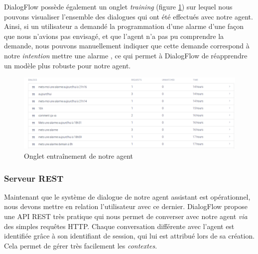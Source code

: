 DialogFlow possède également un onglet \og \emph{training} \fg{} (figure \ref{training}) sur lequel nous pouvons visualiser l'ensemble des dialogues qui ont été effectués avec notre agent. Ainsi,
si un utilisateur a demandé la programmation d'une alarme d'une façon que nous n'avions pas envisagé, et que l'agent n'a pas pu comprendre la demande, nous pouvons 
manuellement indiquer que cette demande correspond à notre \emph{intention} \og mettre une alarme \fg, ce qui permet à DialogFlow de réapprendre un modèle plus robuste pour notre agent.

\begin{figure}[H]
    \centering
        \centering
        \includegraphics[width=1.2\textwidth]{images/training.png}
        \caption{Onglet entraînement de notre agent}
        \label{training}
\end{figure}


\subsubsection{Serveur REST}

Maintenant que le système de dialogue de notre agent assistant est opérationnel, nous devons mettre en relation l'utilisateur avec ce dernier. DialogFlow propose une API REST très pratique
qui nous permet de converser avec notre agent \emph{via} des simples requêtes HTTP. Chaque conversation différente avec l'agent est identifiée grâce à son identifiant de session,
qui lui est attribué lors de sa création. Cela permet de gérer très facilement les \emph{contextes}.\\

